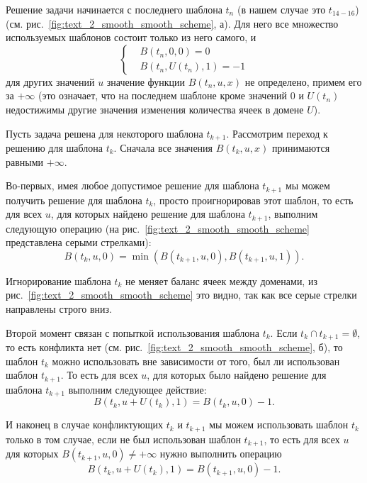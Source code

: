 Решение задачи начинается с последнего шаблона $t_n$ (в нашем случае это $t_{14-16}$) (см. рис.~\ref{fig:text_2_smooth_smooth_scheme}, а).
Для него все множество используемых шаблонов состоит только из него самого, и
\begin{equation}
	\left\{
		\begin{aligned}
			& B(t_n, 0, 0) = 0 \\
			& B(t_n, U(t_n), 1) = -1
		\end{aligned}
	\right.
\end{equation}
для других значений $u$ значение функции $B(t_n, u, x)$ не определено, примем его за $+\infty$ (это означает, что на последнем шаблоне кроме значений $0$ и $U(t_n)$ недостижимы другие значения изменения количества ячеек в домене $U$).

Пусть задача решена для некоторого шаблона $t_{k + 1}$.
Рассмотрим переход к решению для шаблона $t_k$.
Сначала все значения $B(t_k, u, x)$ принимаются равными $+\infty$.

Во-первых, имея любое допустимое решение для шаблона $t_{k + 1}$ мы можем получить решение для шаблона $t_k$, просто проигнорировав этот шаблон, то есть для всех $u$, для которых найдено решение для шаблона $t_{k + 1}$, выполним следующую операцию (на рис.~\ref{fig:text_2_smooth_smooth_scheme} представлена серыми стрелками):
\begin{equation}
	B(t_k, u, 0) = \min \left( B(t_{k + 1}, u, 0), B(t_{k + 1}, u, 1) \right).
\end{equation}

Игнорирование шаблона $t_k$ не меняет баланс ячеек между доменами, из рис.~\ref{fig:text_2_smooth_smooth_scheme} это видно, так как все серые стрелки направлены строго вниз.

Второй момент связан с попыткой использования шаблона $t_k$.
Если $t_k \cap t_{k + 1} = \emptyset$, то есть конфликта нет (см. рис.~\ref{fig:text_2_smooth_smooth_scheme}, б), то шаблон $t_k$ можно использовать вне зависимости от того, был ли использован шаблон $t_{k + 1}$.
То есть для всех $u$, для которых было найдено решение для шаблона $t_{k + 1}$ выполним следующее действие:
\begin{equation}
	B(t_k, u + U(t_k), 1) = B(t_k, u, 0) - 1.
\end{equation}

И наконец в случае конфликтующих $t_k$ и $t_{k + 1}$ мы можем использовать шаблон $t_k$ только в том случае, если не был использован шаблон $t_{k + 1}$, то есть для всех $u$ для которых $B(t_{k + 1}, u, 0) \ne +\infty$ нужно выполнить операцию
\begin{equation}
	B(t_k, u + U(t_k), 1) = B(t_{k + 1}, u, 0) - 1.
\end{equation}


